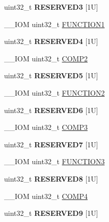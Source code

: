 \begin{DoxyCompactItemize}
uint32\+\_\+t {\bfseries R\+E\+S\+E\+R\+V\+E\+D3} \mbox{[}1\+U\mbox{]}
\item 
\+\_\+\+\_\+\+I\+OM uint32\+\_\+t \mbox{\hyperlink{struct_d_w_t___type_a8dfcf25675f9606aa305c46e85182e4e}{F\+U\+N\+C\+T\+I\+O\+N1}}
\item 
\mbox{\label{struct_d_w_t___type_abaa69c512745a42285bcc92a1e99b565}} 
uint32\+\_\+t {\bfseries R\+E\+S\+E\+R\+V\+E\+D4} \mbox{[}1\+U\mbox{]}
\item 
\+\_\+\+\_\+\+I\+OM uint32\+\_\+t \mbox{\hyperlink{struct_d_w_t___type_a5ae6dde39989f27bae90afc2347deb46}{C\+O\+M\+P2}}
\item 
\mbox{\label{struct_d_w_t___type_a1e54059fc51e21b36885d31e72b68cd5}} 
uint32\+\_\+t {\bfseries R\+E\+S\+E\+R\+V\+E\+D5} \mbox{[}1\+U\mbox{]}
\item 
\+\_\+\+\_\+\+I\+OM uint32\+\_\+t \mbox{\hyperlink{struct_d_w_t___type_ab1b60d6600c38abae515bab8e86a188f}{F\+U\+N\+C\+T\+I\+O\+N2}}
\item 
\mbox{\label{struct_d_w_t___type_a62a31fc56c843f2b0e882581a4bd95d2}} 
uint32\+\_\+t {\bfseries R\+E\+S\+E\+R\+V\+E\+D6} \mbox{[}1\+U\mbox{]}
\item 
\+\_\+\+\_\+\+I\+OM uint32\+\_\+t \mbox{\hyperlink{struct_d_w_t___type_a85eb73d1848ac3f82d39d6c3e8910847}{C\+O\+M\+P3}}
\item 
\mbox{\label{struct_d_w_t___type_a55303904d9b89ffe6c28c698d997ed10}} 
uint32\+\_\+t {\bfseries R\+E\+S\+E\+R\+V\+E\+D7} \mbox{[}1\+U\mbox{]}
\item 
\+\_\+\+\_\+\+I\+OM uint32\+\_\+t \mbox{\hyperlink{struct_d_w_t___type_a52d4ff278fae6f9216c63b74ce328841}{F\+U\+N\+C\+T\+I\+O\+N3}}
\item 
\mbox{\label{struct_d_w_t___type_a4225e4489493a263ecfb7b00644c04a6}} 
uint32\+\_\+t {\bfseries R\+E\+S\+E\+R\+V\+E\+D8} \mbox{[}1\+U\mbox{]}
\item 
\+\_\+\+\_\+\+I\+OM uint32\+\_\+t \mbox{\hyperlink{struct_d_w_t___type_a86bc7f4ad425a05b29978a6f97563783}{C\+O\+M\+P4}}
\item 
\mbox{\label{struct_d_w_t___type_a8d4678b07579ce92ecb788d4c4dfef81}} 
uint32\+\_\+t {\bfseries R\+E\+S\+E\+R\+V\+E\+D9} \mbox{[}1\+U\mbox{]}

\end{DoxyCompactItemize}
